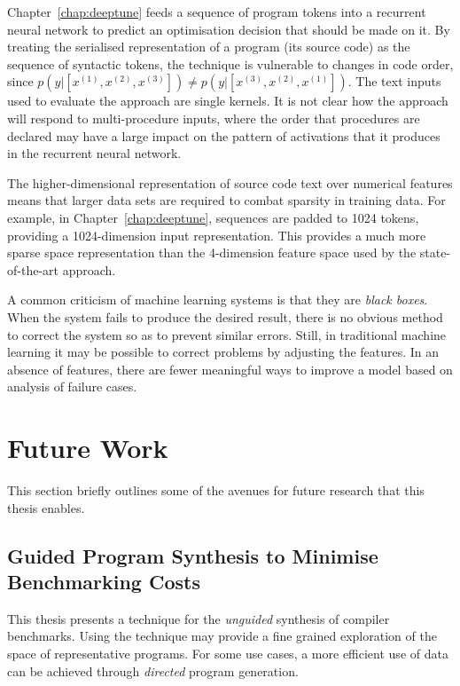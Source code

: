 Chapter~\ref{chap:deeptune} feeds a sequence of program tokens into a recurrent neural network to predict an optimisation decision that should be made on it. By treating the serialised representation of a program (its source code) as the sequence of syntactic tokens, the technique is vulnerable to changes in code order, since $p(y|[x^{(1)}, x^{(2)}, x^{(3)}]) \ne p(y|[x^{(3)}, x^{(2)}, x^{(1)}])$. The text inputs used to evaluate the approach are single kernels. It is not clear how the approach will respond to multi-procedure inputs, where the order that procedures are declared may have a large impact on the pattern of activations that it produces in the recurrent neural network.



The higher-dimensional representation of source code text over numerical features means that larger data sets are required to combat sparsity in training data. For example, in Chapter~\ref{chap:deeptune}, sequences are padded to 1024 tokens, providing a 1024-dimension input representation. This provides a much more sparse space representation than the 4-dimension feature space used by the state-of-the-art approach.

A common criticism of machine learning systems is that they are \emph{black boxes}. When the system fails to produce the desired result, there is no obvious method to correct the system so as to prevent similar errors. Still, in traditional machine learning it may be possible to correct problems by adjusting the features. In an absence of features, there are fewer meaningful ways to improve a model based on analysis of failure cases.


\section{Future Work}
\label{sec:conclusions-future-work}

This section briefly outlines some of the avenues for future research that this thesis enables.

\subsection{Guided Program Synthesis to Minimise Benchmarking Costs}

This thesis presents a technique for the \emph{unguided} synthesis of compiler benchmarks. Using the technique may provide a fine grained exploration of the space of representative programs. For some use cases, a more efficient use of data can be achieved through \emph{directed} program generation.


